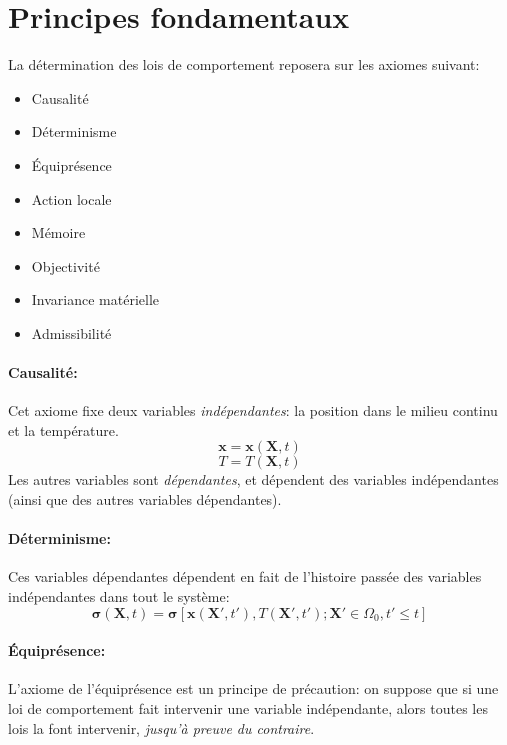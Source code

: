 \section{Principes fondamentaux}
La détermination des lois de comportement reposera sur les axiomes suivant:
\begin{itemize}
\item Causalité
\item Déterminisme
\item \'Equiprésence
\item Action locale
\item Mémoire
\item Objectivité
\item Invariance matérielle
\item Admissibilité
\end{itemize}

\paragraph{Causalité: } Cet axiome fixe deux variables \emph{indépendantes}: la position dans le milieu continu et la température. $$\textbf{x}=\textbf{x}(\textbf{X},t)$$ $$T=T(\textbf{X},t)$$
Les autres variables sont \emph{dépendantes}, et dépendent des variables indépendantes (ainsi que des autres variables dépendantes).
\paragraph{Déterminisme: } Ces variables dépendantes dépendent en fait de l'histoire passée des variables indépendantes dans tout le système:
$$\boldsymbol{\sigma}(\textbf{X},t)=\boldsymbol{\sigma}[\textbf{x}(\textbf{X}',t'), T(\textbf{X}',t');\textbf{X}'\in \Omega_0, t'\leq t]$$ 
\paragraph{\'Equiprésence: } L'axiome de l'équiprésence est un principe de précaution: on suppose que si une loi de comportement fait intervenir une variable indépendante, alors toutes les lois la font intervenir, \emph{jusqu'à preuve du contraire}.
